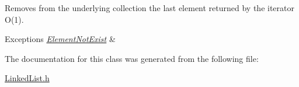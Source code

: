 \label{class_linked_list_1_1_iterator_a36832ccc5473db2ffee78e58447130b8}
Removes from the underlying collection the last element returned by the iterator O(1). 
\begin{DoxyExceptions}{Exceptions}
{\em \hyperlink{class_element_not_exist}{ElementNotExist}} & \\
\hline
\end{DoxyExceptions}


The documentation for this class was generated from the following file:\begin{DoxyCompactItemize}
\item 
\hyperlink{_linked_list_8h}{LinkedList.h}\end{DoxyCompactItemize}

